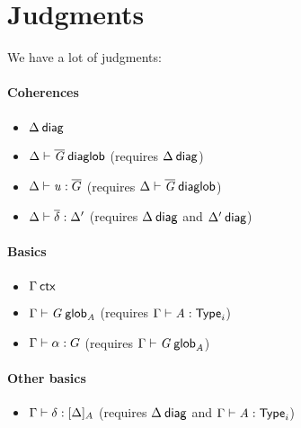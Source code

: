 \newcommand\diagbase[0]{\ensuremath{\mathord{*}}}
\newcommand\interpdiag[2]{\ensuremath{[ #1 ]_{#2}}}

\section{Judgments}

We have a lot of judgments:

\paragraph{Coherences}

\begin{itemize}
\item $\wfdiag{\Delta}$
\item $\wfdiaglob{\Delta}{\diag G}$ (requires $\wfdiag{\Delta}$)
\item $\ofdiaglob{\Delta}{u}{\diag G}$ (requires $\wfdiaglob{\Delta}{\diag G}$)
\item $\substdiaglob{\Delta}{\diag \delta}{\Delta'}$ (requires $\wfdiag{\Delta}$
  and $\wfdiag{\Delta'}$)
\end{itemize}

\paragraph{Basics}

\begin{itemize}
\item $\wfctx{\Gamma}$
\item $\wfglob{\Gamma}{G}{}{A}$ (requires $\ofglob{\Gamma}{A}{\typ{i}}$)
\item $\ofglob{\Gamma}{\alpha}{G}$ (requires $\wfglob{\Gamma}{G}{}{A}$)
\end{itemize}

\paragraph{Other basics}

\begin{itemize}
\item $\ofinterp{\Gamma}{\delta}{\Delta}{A}$ (requires $\wfdiag{\Delta}$ and
  $\wftype{\Gamma}{A}$)
\end{itemize}


